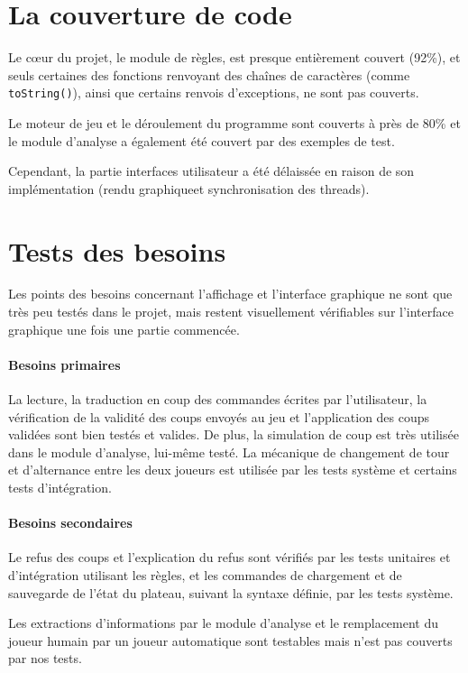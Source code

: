 \documentclass[a4paper]{report}
\begin{document}
\section{La couverture de code}

Le cœur du projet, le module de règles, est presque entièrement couvert (92\%), et seuls certaines des fonctions renvoyant des chaînes de caractères (comme {\tt toString()}), ainsi que certains renvois d'exceptions, ne sont pas couverts.

Le moteur de jeu et le déroulement du programme sont couverts à près de 80\% et le module d'analyse a également été couvert par des exemples de test.

Cependant, la partie interfaces utilisateur a été délaissée en raison de son implémentation (rendu graphiqueet synchronisation des threads).

\section{Tests des besoins}
Les points des besoins concernant l'affichage et l'interface graphique ne sont que très peu testés dans le projet, mais restent visuellement vérifiables sur l'interface graphique une fois une partie commencée.

\paragraph*{Besoins primaires}
La lecture, la traduction en coup des commandes écrites par l'utilisateur, la vérification de la validité des coups envoyés au jeu et l'application des coups validées sont bien testés et valides. De plus, la simulation de coup est très utilisée dans le module d'analyse, lui-même testé. La mécanique de changement de tour et d'alternance entre les deux joueurs est utilisée par les tests système et certains tests d'intégration.

\paragraph*{Besoins secondaires}
Le refus des coups et l'explication du refus sont vérifiés par les tests unitaires et d'intégration utilisant les règles, et les commandes de chargement et de sauvegarde de l'état du plateau, suivant la syntaxe définie, par les tests système.

Les extractions d'informations par le module d'analyse et le remplacement du joueur humain par un joueur automatique sont testables mais n'est pas couverts par nos tests.
\end{document}
